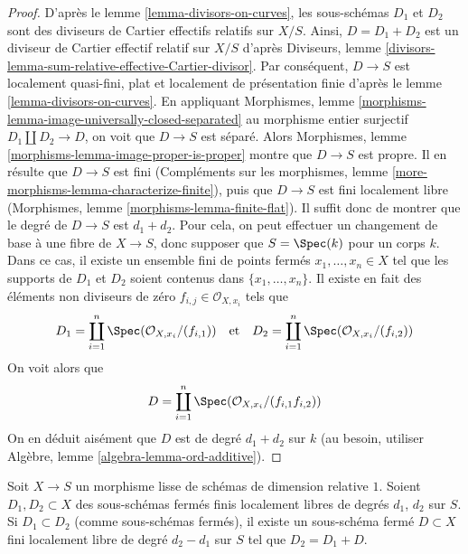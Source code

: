 \begin{proof}
D'après le lemme \ref{lemma-divisors-on-curves}, les sous-schémas $D_1$
et $D_2$ sont des diviseurs de Cartier effectifs relatifs sur $X/S$.
Ainsi, $D = D_1 + D_2$ est un diviseur de Cartier effectif relatif
sur $X/S$ d'après
Diviseurs, lemme \ref{divisors-lemma-sum-relative-effective-Cartier-divisor}.
Par conséquent, $D \to S$ est localement quasi-fini, plat et
localement de présentation finie d'après le
lemme \ref{lemma-divisors-on-curves}.
En appliquant
Morphismes, lemme \ref{morphisms-lemma-image-universally-closed-separated}
au morphisme entier surjectif $D_1 \amalg D_2 \to D$,
on voit que $D \to S$ est séparé. Alors
Morphismes, lemme \ref{morphisms-lemma-image-proper-is-proper}
montre que $D \to S$ est propre.
Il en résulte que $D \to S$ est fini
(Compléments sur les morphismes, lemme \ref{more-morphisms-lemma-characterize-finite}),
puis que $D \to S$ est fini localement libre
(Morphismes, lemme \ref{morphisms-lemma-finite-flat}).
Il suffit donc de montrer que le degré de $D \to S$ est $d_1 + d_2$.
Pour cela, on peut effectuer un changement de base à une fibre de $X \to S$, donc
supposer que $S = \Spec(k)$ pour un corps $k$.
Dans ce cas, il existe un ensemble fini de points fermés
$x_1, \ldots, x_n \in X$ tel que les supports de $D_1$ et $D_2$
soient contenus dans $\{x_1, \ldots, x_n\}$.
Il existe en fait des éléments non diviseurs de zéro $f_{i, j} \in \mathcal{O}_{X, x_i}$
tels que
$$
D_1 = \coprod_{i = 1}^n \Spec(\mathcal{O}_{X, x_i}/(f_{i, 1}))
\quad\text{et}\quad
D_2 = \coprod_{i = 1}^n \Spec(\mathcal{O}_{X, x_i}/(f_{i, 2}))
$$
On voit alors que
$$
D = \coprod_{i = 1}^n \Spec(\mathcal{O}_{X, x_i}/(f_{i, 1}f_{i, 2}))
$$
On en déduit aisément que $D$ est de degré $d_1 + d_2$
sur $k$ (au besoin, utiliser Algèbre, lemme \ref{algebra-lemma-ord-additive}).
\end{proof}

\begin{lemma}
\label{lemma-difference-divisors-on-curves}
Soit $X \to S$ un morphisme lisse de schémas de dimension relative $1$.
Soient $D_1, D_2 \subset X$ des sous-schémas fermés finis localement libres de
degrés $d_1$, $d_2$ sur $S$. Si $D_1 \subset D_2$ (comme sous-schémas fermés),
il existe un sous-schéma fermé $D \subset X$ fini localement libre de
degré $d_2 - d_1$ sur $S$ tel que $D_2 = D_1 + D$.
\end{lemma}

